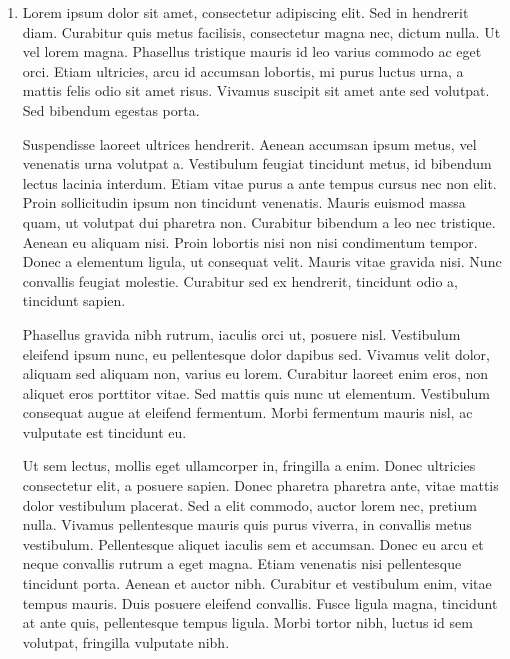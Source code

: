 \documentclass[11pt]{article}
\begin{document}
\begin{enumerate}
		\item
		\begin{problem}{}
		Lorem ipsum dolor sit amet, consectetur adipiscing elit. Sed in hendrerit diam. Curabitur quis metus facilisis, consectetur magna nec, dictum nulla. Ut vel lorem magna. Phasellus tristique mauris id leo varius commodo ac eget orci. Etiam ultricies, arcu id accumsan lobortis, mi purus luctus urna, a mattis felis odio sit amet risus. Vivamus suscipit sit amet ante sed volutpat. Sed bibendum egestas porta.
		\end{problem}
		\begin{solution}
		Suspendisse laoreet ultrices hendrerit. Aenean accumsan ipsum metus, vel venenatis urna volutpat a. Vestibulum feugiat tincidunt metus, id bibendum lectus lacinia interdum. Etiam vitae purus a ante tempus cursus nec non elit. Proin sollicitudin ipsum non tincidunt venenatis. Mauris euismod massa quam, ut volutpat dui pharetra non. Curabitur bibendum a leo nec tristique. Aenean eu aliquam nisi. Proin lobortis nisi non nisi condimentum tempor. Donec a elementum ligula, ut consequat velit. Mauris vitae gravida nisi. Nunc convallis feugiat molestie. Curabitur sed ex hendrerit, tincidunt odio a, tincidunt sapien.
		\end{solution}
		\begin{reflection}
		Phasellus gravida nibh rutrum, iaculis orci ut, posuere nisl. Vestibulum eleifend ipsum nunc, eu pellentesque dolor dapibus sed. Vivamus velit dolor, aliquam sed aliquam non, varius eu lorem. Curabitur laoreet enim eros, non aliquet eros porttitor vitae. Sed mattis quis nunc ut elementum. Vestibulum consequat augue at eleifend fermentum. Morbi fermentum mauris nisl, ac vulputate est tincidunt eu.
		
		Ut sem lectus, mollis eget ullamcorper in, fringilla a enim. Donec ultricies consectetur elit, a posuere sapien. Donec pharetra pharetra ante, vitae mattis dolor vestibulum placerat. Sed a elit commodo, auctor lorem nec, pretium nulla. Vivamus pellentesque mauris quis purus viverra, in convallis metus vestibulum. Pellentesque aliquet iaculis sem et accumsan. Donec eu arcu et neque convallis rutrum a eget magna. Etiam venenatis nisi pellentesque tincidunt porta. Aenean et auctor nibh. Curabitur et vestibulum enim, vitae tempus mauris. Duis posuere eleifend convallis. Fusce ligula magna, tincidunt at ante quis, pellentesque tempus ligula. Morbi tortor nibh, luctus id sem volutpat, fringilla vulputate nibh.
		\end{reflection}
	\end{enumerate}
\end{document}
